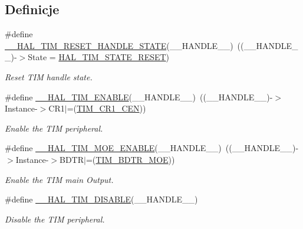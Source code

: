 \subsection*{Definicje}
\begin{DoxyCompactItemize}
\item 
\#define \hyperlink{group___t_i_m___exported___macros_gace20fd4e38231b9682fbc83a80ec19a3}{\+\_\+\+\_\+\+H\+A\+L\+\_\+\+T\+I\+M\+\_\+\+R\+E\+S\+E\+T\+\_\+\+H\+A\+N\+D\+L\+E\+\_\+\+S\+T\+A\+TE}(\+\_\+\+\_\+\+H\+A\+N\+D\+L\+E\+\_\+\+\_\+)~((\+\_\+\+\_\+\+H\+A\+N\+D\+L\+E\+\_\+\+\_\+)-\/$>$State = \hyperlink{group___t_i_m___exported___types_ggae0994cf5970e56ca4903e9151f40010ca28011b79e60b74a6c55947c505c51cbc}{H\+A\+L\+\_\+\+T\+I\+M\+\_\+\+S\+T\+A\+T\+E\+\_\+\+R\+E\+S\+ET})
\begin{DoxyCompactList}\small\item\em Reset T\+IM handle state. \end{DoxyCompactList}\item 
\#define \hyperlink{group___t_i_m___exported___macros_ga1a90544705059e9f19f991651623b0c0}{\+\_\+\+\_\+\+H\+A\+L\+\_\+\+T\+I\+M\+\_\+\+E\+N\+A\+B\+LE}(\+\_\+\+\_\+\+H\+A\+N\+D\+L\+E\+\_\+\+\_\+)~((\+\_\+\+\_\+\+H\+A\+N\+D\+L\+E\+\_\+\+\_\+)-\/$>$Instance-\/$>$C\+R1$\vert$=(\hyperlink{group___peripheral___registers___bits___definition_ga93d86355e5e3b399ed45e1ca83abed2a}{T\+I\+M\+\_\+\+C\+R1\+\_\+\+C\+EN}))
\begin{DoxyCompactList}\small\item\em Enable the T\+IM peripheral. \end{DoxyCompactList}\item 
\#define \hyperlink{group___t_i_m___exported___macros_ga04890dcef3ed061854721a3672585607}{\+\_\+\+\_\+\+H\+A\+L\+\_\+\+T\+I\+M\+\_\+\+M\+O\+E\+\_\+\+E\+N\+A\+B\+LE}(\+\_\+\+\_\+\+H\+A\+N\+D\+L\+E\+\_\+\+\_\+)~((\+\_\+\+\_\+\+H\+A\+N\+D\+L\+E\+\_\+\+\_\+)-\/$>$Instance-\/$>$B\+D\+TR$\vert$=(\hyperlink{group___peripheral___registers___bits___definition_ga277a096614829feba2d0a4fbb7d3dffc}{T\+I\+M\+\_\+\+B\+D\+T\+R\+\_\+\+M\+OE}))
\begin{DoxyCompactList}\small\item\em Enable the T\+IM main Output. \end{DoxyCompactList}\item 
\#define \hyperlink{group___t_i_m___exported___macros_ga6a5e653e0e06a04151b74eb1a5f96eb6}{\+\_\+\+\_\+\+H\+A\+L\+\_\+\+T\+I\+M\+\_\+\+D\+I\+S\+A\+B\+LE}(\+\_\+\+\_\+\+H\+A\+N\+D\+L\+E\+\_\+\+\_\+)
\begin{DoxyCompactList}\small\item\em Disable the T\+IM peripheral. \end{DoxyCompactList}\item 

\end{DoxyCompactItemize}
